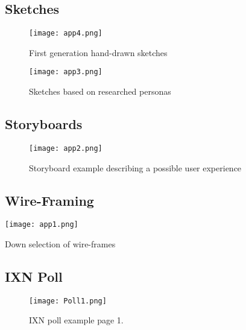 \begin{landscape}
\subsection{Sketches}
 \begin{figure}[H]
      \centering
      \texttt{[image: app4.png]}
      \caption{First generation hand-drawn sketches}
 \end{figure}
\end{landscape}

 \newpage

\begin{landscape}
 \begin{figure}[H]
      \centering
      \texttt{[image: app3.png]}
      \caption{Sketches based on researched personas}
 \end{figure}
  \end{landscape}

\newpage

\begin{landscape}
\subsection{Storyboards}
 \begin{figure}[H]
      \centering
      \texttt{[image: app2.png]}
      \caption{Storyboard example describing a possible user experience}
 \end{figure}

 \newpage

\subsection{Wire-Framing}
\begin{table}[H]
      \centering
      \texttt{[image: app1.png]}
      \caption{Down selection of wire-frames}
 \end{table}
  \end{landscape}
\subsection{IXN Poll}
\begin{figure}[H]
      \centering
      \texttt{[image: Poll1.png]}
      \caption{IXN poll example page 1.}
 \end{figure}

